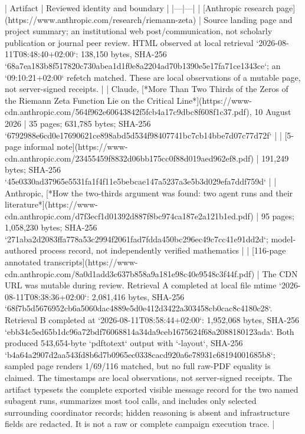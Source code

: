 \documentclass[11pt]{article}
\begin{document}
\begin{markdown}
| Artifact | Reviewed identity and boundary |
|---|---|
| [Anthropic research page](https://www.anthropic.com/research/riemann-zeta) | Source landing page and project summary; an institutional web post/communication, not scholarly publication or journal peer review. HTML observed at local retrieval `2026-08-11T08:48:40+02:00`: 138,150 bytes, SHA-256 `68a7ea183b8f517820c730abea1d1f0e8a2204ad70b1390e5e17fa71ce1343ce`; an `09:10:21+02:00` refetch matched. These are local observations of a mutable page, not server-signed receipts. |
| Claude, [*More Than Two Thirds of the Zeros of the Riemann Zeta Function Lie on the Critical Line*](https://www-cdn.anthropic.com/564f962e60643842f5fcb4a17c9dbc8f608f1c37.pdf), 10 August 2026 | 35 pages; 631,785 bytes; SHA-256 `6792988e6cd0e17690621ce898abd5d534f98407741bc7cb14bbe7d07c77d72f` |
| [5-page informal note](https://www-cdn.anthropic.com/23455459f8832d06bb175cc0f88d019aed962ef8.pdf) | 191,249 bytes; SHA-256 `45e0330ad37965e5531fa1f4f11e5bebcae147a5237a3e5b3d029efa7ddf759d` |
| Anthropic, [*How the two-thirds argument was found: two agent runs and their literature*](https://www-cdn.anthropic.com/d7f3ecf1d01392d887f8bc974ca187e2a121b1ed.pdf) | 95 pages; 1,058,230 bytes; SHA-256 `271aba2d2083ffa778a53c2994f2061fad7fdda450bc296ec49c7cc41e91dd2d`; model-authored process record, not independently verified mathematics |
| [116-page annotated transcripts](https://www-cdn.anthropic.com/8a0d1add3c637b858a9a181e98c40e9548c3f44f.pdf) | The CDN URL was mutable during review. Retrieval A completed at local file mtime `2026-08-11T08:38:36+02:00`: 2,081,416 bytes, SHA-256 `68f7b5d5676952cb6a5060dac4889e5d0e412d3422a303458cb0cac8c4180c28`. Retrieval B completed at `2026-08-11T08:58:44+02:00`: 1,952,068 bytes, SHA-256 `ebb34c5ed65b1dc96a72bdf76068814a34da9ceb1675624f68a2088180123ada`. Both produced 543,654-byte `pdftotext` output with `-layout`, SHA-256 `b4a64a2907d2aa543fd8b6d7b0965ec0338cacd920a6e78931c68194001685b8`; sampled page renders 1/69/116 matched, but no full raw-PDF equality is claimed. The timestamps are local observations, not server-signed receipts. The artifact typesets the complete exported visible message record for the two named subagent runs, summarizes most tool calls, and includes only selected surrounding coordinator records; hidden reasoning is absent and infrastructure fields are redacted. It is not a raw or complete campaign execution trace. |

\end{markdown}
\end{document}
